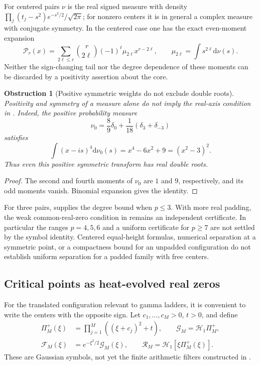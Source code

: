 \documentclass[11pt]{article}
\newtheorem{obstruction}[theorem]{Obstruction}
\theoremstyle{definition}
\theoremstyle{remark}
\newcommand{\dd}{\mathrm d}
\begin{document}
For centered pairs $\nu$ is the real signed measure with density
$\prod_j(t_j-s^2)e^{-s^2/2}/\sqrt{2\pi}$; for nonzero centers it is
in general a complex measure with conjugate symmetry.  In the centered
case one has the exact even-moment expansion
\begin{equation}
 \mathcal P_r(x)=\sum_{2\ell\le r}\binom r{2\ell}
 (-1)^\ell\mu_{2\ell}x^{r-2\ell},\qquad
 \mu_{2\ell}=\int s^{2\ell}\dd\nu(s).
 \label{eq:heatblock-even-moments}
\end{equation}
Neither the sign-changing tail nor the degree dependence of these
moments can be discarded by a positivity assertion about the core.

\begin{obstruction}[Positive symmetric weights do not exclude double roots]
\label{obs:heatblock-positive-weight}
Positivity and symmetry of a measure alone do not imply the real-axis
condition in .  Indeed, the positive
probability measure
\[
 \nu_0=\frac89\delta_0+\frac1{18}(\delta_3+\delta_{-3})
\]
satisfies
\[
 \int(x-is)^4\dd\nu_0(s)=x^4-6x^2+9=(x^2-3)^2.
\]
Thus even this positive symmetric transform has real double roots.
\end{obstruction}

\begin{proof}
The second and fourth moments of $\nu_0$ are $1$ and $9$,
respectively, and its odd moments vanish.  Binomial expansion gives
the identity.
\end{proof}

For three pairs,  supplies the degree bound
when $p\le3$.  With more real padding, the weak common-real-zero
condition in  remains an independent
certificate.  In particular the ranges $p=4,5,6$ and a uniform
certificate for $p\ge7$ are not settled by the symbol identity.
Centered equal-height formulas, numerical separation at a symmetric
point, or a compactness bound for an unpadded configuration do not
establish uniform separation for a padded family with free centers.

\subsection{Critical points as heat-evolved real zeros}
\label{subsec:heatblock-critical-zero}

For the translated configuration relevant to gamma ladders, it is
convenient to write the centers with the opposite sign.  Let
$c_1,\ldots,c_M>0$, $t>0$, and define
\begin{equation}
 \begin{split}
 \Pi_M^+(\xi)&=\prod_{j=1}^M((\xi+c_j)^2+t),\qquad
 \mathscr G_M=\mathcal H_1\Pi_M^+,\\
 \mathscr F_M(\xi)&=e^{-\xi^2/2}\mathscr G_M(\xi),\qquad
 \mathscr R_M=\mathcal H_1[\xi\Pi_M^+(\xi)].
 \end{split}
 \label{eq:heatblock-critical-symbol}
\end{equation}
These are Gaussian symbols, not yet the finite arithmetic filters
constructed in .
\end{document}
